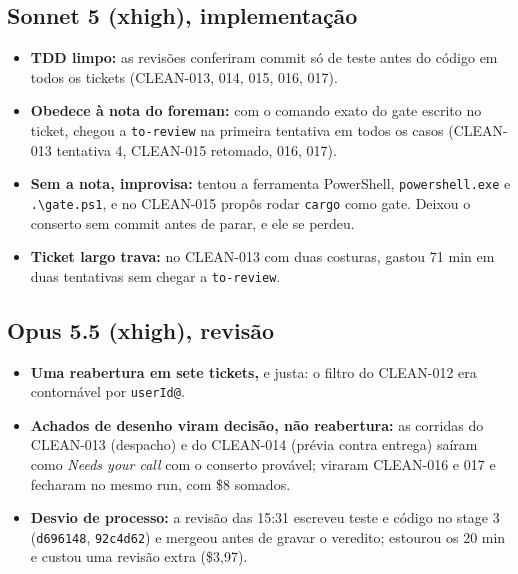 \documentclass[11pt,a4paper]{article}
\begin{document}
\subsection*{Sonnet 5 (xhigh), implementação}
\begin{itemize}
  \item \textbf{TDD limpo:} as revisões conferiram commit só de teste antes do
        código em todos os tickets (CLEAN-013, 014, 015, 016, 017).
  \item \textbf{Obedece à nota do foreman:} com o comando exato do gate escrito
        no ticket, chegou a \texttt{to-review} na primeira tentativa em todos
        os casos (CLEAN-013 tentativa 4, CLEAN-015 retomado, 016, 017).
  \item \textbf{Sem a nota, improvisa:} tentou a ferramenta PowerShell,
        \texttt{powershell.exe} e \texttt{.\textbackslash gate.ps1}, e no
        CLEAN-015 propôs rodar \texttt{cargo} como gate. Deixou o conserto sem
        commit antes de parar, e ele se perdeu.
  \item \textbf{Ticket largo trava:} no CLEAN-013 com duas costuras, gastou
        71 min em duas tentativas sem chegar a \texttt{to-review}.
\end{itemize}

\subsection*{Opus 5.5 (xhigh), revisão}
\begin{itemize}
  \item \textbf{Uma reabertura em sete tickets,} e justa: o filtro do
        CLEAN-012 era contornável por \texttt{userId@}.
  \item \textbf{Achados de desenho viram decisão, não reabertura:} as corridas
        do CLEAN-013 (despacho) e do CLEAN-014 (prévia contra entrega) saíram
        como \emph{Needs your call} com o conserto provável; viraram CLEAN-016
        e 017 e fecharam no mesmo run, com \$8 somados.
  \item \textbf{Desvio de processo:} a revisão das 15:31 escreveu teste e
        código no stage 3 (\texttt{d696148}, \texttt{92c4d62}) e mergeou antes
        de gravar o veredito; estourou os 20 min e custou uma revisão extra
        (\$3,97).
\end{itemize}
\end{document}
